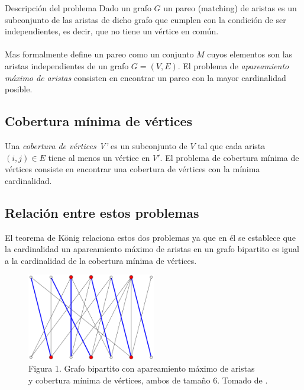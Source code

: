 \documentclass[12pt,a4paper]{article}
\begin{document}
\begin{section}{Descripción del problema} \noindent 
Dado un grafo $G$ un pareo (matching) de aristas es un subconjunto de las aristas de dicho grafo que cumplen con la condición de ser independientes, es decir, que no tiene un vértice en común\cite{le2014algorithms}.\\\\
Mas formalmente \cite{butenko2003maximum} define un pareo como un conjunto $M$ cuyos elementos son las aristas independientes de un grafo $G=(V,E)$. El problema de \textit{apareamiento máximo de aristas} consisten en encontrar un pareo con la mayor cardinalidad posible.

\subsection{Cobertura mínima de vértices} \noindent 
Una \textit{cobertura de vértices V'} es un subconjunto de $V$ tal que cada arista $(i,j) \in E$ tiene al menos un vértice en $V'$. El problema de cobertura mínima de vértices consiste en encontrar una cobertura de vértices con la mínima cardinalidad\cite{butenko2003maximum}.

\subsection{Relación entre estos problemas} \noindent 
El teorema de König relaciona estos dos problemas ya que en él se establece que la cardinalidad un apareamiento máximo de aristas en un grafo bipartito es igual a la cardinalidad de la cobertura mínima de vértices\cite{rizzi2000short}. 

\begin{center}
	\begin{figure}[h]
		\centering
		\captionsetup{justification=centering}
		\includegraphics[width=0.50\textwidth]{images/Konigs-theorem-graph.png}
		\caption*{
			\footnotesize Figura 1. Grafo bipartito con apareamiento máximo de aristas \\y 		cobertura mínima de vértices, ambos de tamaño 6. Tomado de \cite{wikipedia_2019}.
		}
	\end{figure}
\end{center}
\end{section}
\end{document}
